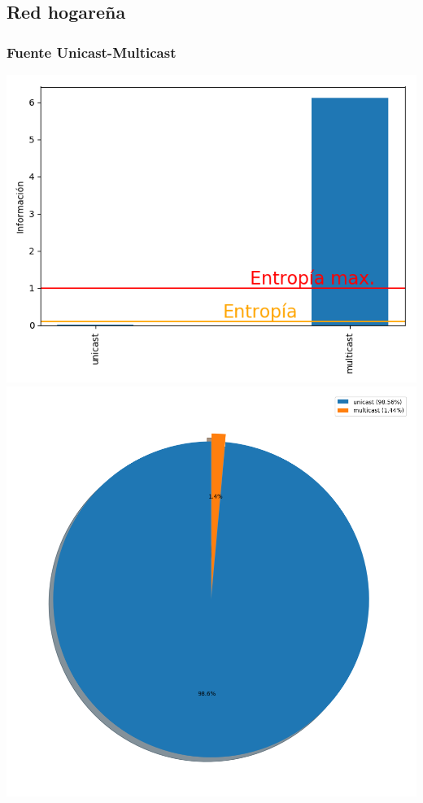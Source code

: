 \subsection{Red hogareña}

\subsubsection{Fuente Unicast-Multicast}

\hspace*{-1.5cm}
 \includegraphics[scale=0.6]{../plots/mauro_s1_informacion.png}
 \includegraphics[scale=0.4]{../plots/mauro_s1_probabilidades.png}

